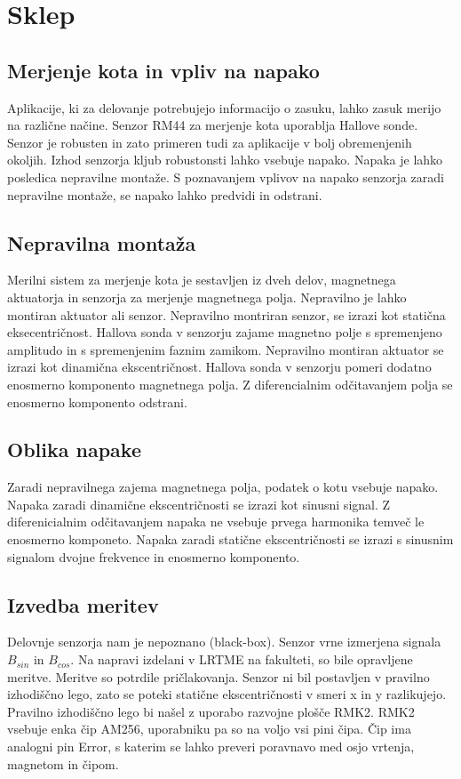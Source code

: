 \chapter{Sklep}
\section{Merjenje kota in vpliv na napako}
Aplikacije, ki za delovanje potrebujejo informacijo o zasuku, lahko zasuk merijo na različne načine. Senzor RM44 za merjenje kota uporablja Hallove sonde. Senzor je robusten in zato primeren tudi za aplikacije v bolj obremenjenih okoljih. Izhod senzorja kljub robustonsti lahko vsebuje napako. Napaka je lahko posledica nepravilne montaže. S poznavanjem vplivov na napako senzorja zaradi nepravilne montaže, se napako lahko predvidi in odstrani.
\section{Nepravilna montaža}
Merilni sistem za merjenje kota je sestavljen iz dveh delov, magnetnega aktuatorja in senzorja za merjenje magnetnega polja. Nepravilno je lahko montiran aktuator ali senzor.
Nepravilno montriran senzor, se izrazi kot statična eksecentričnost. Hallova sonda v senzorju zajame magnetno polje s spremenjeno amplitudo in s spremenjenim faznim zamikom.
 Nepravilno montiran aktuator se izrazi kot dinamična ekscentričnost. Hallova sonda v senzorju pomeri dodatno enosmerno komponento magnetnega polja. Z diferencialnim odčitavanjem polja se  enosmerno komponento odstrani.
\section{Oblika napake}
Zaradi nepravilnega zajema magnetnega polja, podatek o kotu vsebuje napako. Napaka zaradi dinamične ekscentričnosti se izrazi kot sinusni signal. Z diferenicialnim odčitavanjem napaka ne vsebuje prvega harmonika temveč le enosmerno komponeto. Napaka zaradi statične ekscentričnosti se izrazi s sinusnim signalom dvojne frekvence in enosmerno komponento.
\section{Izvedba meritev}
Delovnje senzorja nam je nepoznano (black-box). Senzor vrne izmerjena signala $B_{sin}$ in $B_{cos}$. Na napravi izdelani v LRTME na fakulteti, so bile opravljene meritve. Meritve so potrdile pričlakovanja.  Senzor ni bil postavljen v pravilno izhodiščno lego, zato se poteki statične ekscentričnosti v smeri x in y razlikujejo. Pravilno izhodiščno lego bi našel  z uporabo razvojne plošče RMK2. RMK2 vsebuje enka čip AM256, uporabniku pa so na voljo vsi pini čipa. Čip ima analogni pin Error, s katerim se lahko preveri poravnavo med osjo vrtenja, magnetom in čipom.
